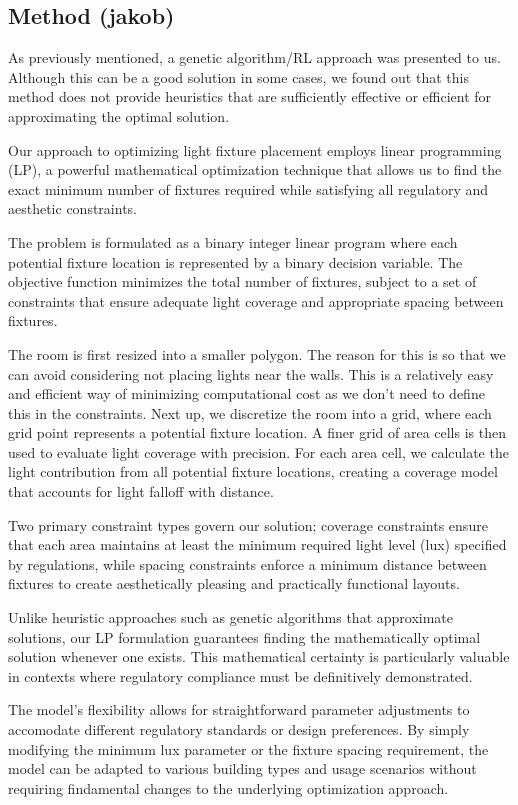 \documentclass{article}
\begin{document}
\subsection{Method (jakob)}

As previously mentioned, a genetic algorithm/RL approach was presented to us. Although this can be a good solution in some cases, we found out that
this method does not provide heuristics that are sufficiently effective or efficient for approximating the optimal solution.

Our approach to optimizing light fixture placement employs linear programming (LP), a powerful mathematical optimization technique that allows us to 
find the exact minimum number of fixtures required while satisfying all regulatory and aesthetic constraints.

The problem is formulated as a binary integer linear program where each potential fixture location is represented by a binary decision 
variable. The objective function minimizes the total number of fixtures, subject to a set of constraints that ensure adequate light coverage 
and appropriate spacing between fixtures. 

The room is first resized into a smaller polygon. The reason for this is so that we can avoid considering not placing lights near the walls. 
This is a relatively easy and efficient way of minimizing computational cost as we don't need to define this in the constraints. Next up, we 
discretize the room into a grid, where each grid point represents a potential fixture location. A finer grid of area cells is then used to evaluate
light coverage with precision. For each area cell, we calculate the light contribution from all potential fixture locations, creating a coverage
model that accounts for light falloff with distance. 

Two primary constraint types govern our solution; coverage constraints ensure that each area maintains at least the minimum required light level 
(lux) specified by regulations, while spacing constraints enforce a minimum distance between fixtures to create aesthetically pleasing and 
practically functional layouts. 

Unlike heuristic approaches such as genetic algorithms that approximate solutions, our LP formulation guarantees finding the mathematically optimal 
solution whenever one exists. This mathematical certainty is particularly valuable in contexts where regulatory compliance must be definitively
demonstrated. 

The model's flexibility allows for straightforward parameter adjustments to accomodate different regulatory standards or design preferences. 
By simply modifying the minimum lux parameter or the fixture spacing requirement, the model can be adapted to various building types and usage 
scenarios without requiring findamental changes to the underlying optimization approach.
\end{document}
